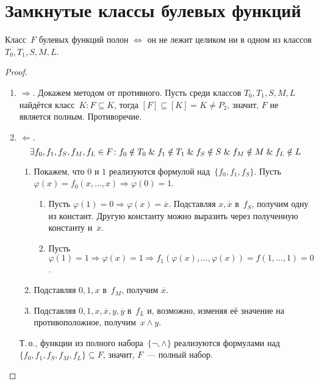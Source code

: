 \section{Замкнутые классы булевых функций}
\begin{theorem}
Класс~$F$ булевых функций полон $\Leftrightarrow$ он не лежит целиком ни в одном из классов $T_0, T_1, S, M, L$.
\end{theorem}
\begin{proof}
\begin{enumerate}
	\item $\Rightarrow$. Докажем методом от противного.
	Пусть среди классов $T_0, T_1, S, M, L$ найдётся класс~$K \colon F \subseteq K$, тогда $[F] \subseteq [K] = K \neq P_2$, значит, $F$ не является полным.
	Противоречие.
	
	\item $\Leftarrow$.
	\begin{equation*}
	\exists f_0, f_1, f_S, f_M, f_L \in F \colon
	f_0 \notin T_0 \mathrel{\&} f_1 \notin T_1 \mathrel{\&} f_S \notin S \mathrel{\&} f_M \notin M \mathrel{\&} f_L \notin L
	\end{equation*}
	\begin{enumerate}
		\item Покажем, что $0$ и $1$ реализуются формулой над~$\{ f_0, f_1, f_S \}$.
		Пусть $\varphi(x) = f_0(x, \ldots, x) \Rightarrow \varphi(0) = 1$.
		\begin{enumerate}
			\item Пусть $\varphi(1) = 0 \Rightarrow \varphi(x) = \overline x$.
			Подставляя $x, \overline x$ в~$f_S$, получим одну из констант.
			Другую константу можно выразить через полученную константу и~$\overline x$.
			\item Пусть $\varphi(1) = 1 \Rightarrow \varphi(x) = 1 \Rightarrow
			f_1(\varphi(x), \ldots, \varphi(x)) = f(1, \ldots, 1) = 0$.
		\end{enumerate}
		
		\item Подставляя $0, 1, x$ в~$f_M$, получим $\overline x$.
		
		\item Подставляя $0, 1, x, \overline x, y, \overline y$ в~$f_L$ и, возможно, изменяя её значение на противоположное, получим~$x \land y$.
	\end{enumerate}
	
	Т.\,о., функции из полного набора~$\{ \neg, \land \}$ реализуются формулами над~$\{ f_0, f_1, f_S, f_M, f_L \} \subseteq F$, значит, $F$~--- полный набор.
\end{enumerate}
\end{proof}

